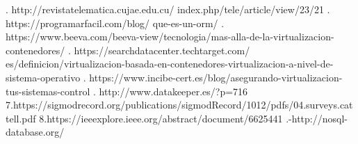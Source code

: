 \documentclass[twoside,twocolumn]{article}
\begin{document}
\begin{flushright}
\begin{itemize}
\begin{thebibliography}{99}
. http://revistatelematica.cujae.edu.cu/
index.php/tele/article/view/23/21
 \break
{}. https://programarfacil.com/blog/
que-es-un-orm/
\break
{}. https://www.beeva.com/beeva-view/tecnologia/mas-alla-de-la-virtualizacion-contenedores/
\break
{}. https://searchdatacenter.techtarget.com/
es/definicion/virtualizacion-basada-en-contenedores-virtualizacion-a-nivel-de-sistema-operativo
\break
{}. https://www.incibe-cert.es/blog/asegurando-virtualizacion-tus-sistemas-control
\break
{}. http://www.datakeeper.es/?p=716
\break
\newblock
7.https://sigmodrecord.org/publications/sigmodRecord/1012/pdfs/04.surveys.cattell.pdf
\break
\newblock
8.https://ieeexplore.ieee.org/abstract/document/6625441
\break
{}.-http://nosql-database.org/
\break
\newblock {\em }
 
\end{thebibliography}

\end{itemize}
\end{flushright}
\end{document}
